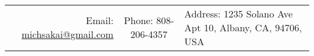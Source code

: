 \documentclass[11pt]{article} %
\begin{document}
\setlength{\parskip}{\baselineskip}%
\pagestyle{empty} %



\begin{center}
	\\%
	\noindent\begin{tabular}{r @{$\quad\bullet\quad$} c @{$\quad\bullet\quad$} l}
		\small{Email: \href{mailto:michsakai@gmail.com}{michsakai@gmail.com}} & \small{Phone: 808-206-4357} & \small{Address: 1235 Solano Ave Apt 10, Albany, CA, 94706, USA}
	\end{tabular}
\end{center}

%


%
\end{document}
